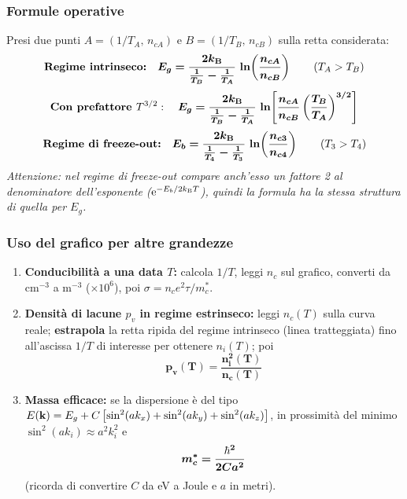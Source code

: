 \subsubsection*{Formule operative}
Presi due punti $A=(1/T_A,\,n_{cA})$ e $B=(1/T_B,\,n_{cB})$ sulla retta considerata:
\[ \textbf{Regime intrinseco:}\quad \bm{E_g = \frac{2k_{\mathrm{B}}}{\frac{1}{T_B}-\frac{1}{T_A}}\,\ln\!\left(\frac{n_{cA}}{n_{cB}}\right)}
   \qquad (T_A>T_B) \]
\[ \textbf{Con prefattore } T^{3/2}:\quad \bm{E_g = \frac{2k_{\mathrm{B}}}{\frac{1}{T_B}-\frac{1}{T_A}}\,\ln\!\left[\frac{n_{cA}}{n_{cB}}\left(\frac{T_B}{T_A}\right)^{3/2}\right]} \]
\[ \textbf{Regime di freeze-out:}\quad \bm{E_b = \frac{2k_{\mathrm{B}}}{\frac{1}{T_4}-\frac{1}{T_3}}\,\ln\!\left(\frac{n_{c3}}{n_{c4}}\right)}
   \qquad (T_3>T_4) \]
\textit{Attenzione: nel regime di freeze-out compare anch'esso un fattore 2 al denominatore dell'esponente ($\mathrm{e}^{-E_b/2k_{\mathrm{B}} T}$), quindi la formula ha la stessa struttura di quella per $E_g$.}

\subsubsection*{Uso del grafico per altre grandezze}
\begin{enumerate}
    \item \textbf{Conducibilità a una data $T$:} calcola $1/T$, leggi $n_c$ sul grafico, converti da cm$^{-3}$ a m$^{-3}$ ($\times10^6$), poi $\sigma = n_ce^2\tau/m_c^*$.
    \item \textbf{Densità di lacune $p_v$ in regime estrinseco:} leggi $n_c(T)$ sulla curva reale; \textbf{estrapola} la retta ripida del regime intrinseco (linea tratteggiata) fino all'ascissa $1/T$ di interesse per ottenere $n_i(T)$; poi
    \[ \bm{p_v(T) = \frac{n_i^2(T)}{n_c(T)}} \]
    \item \textbf{Massa efficace:} se la dispersione è del tipo $E(\mathbf{k})=E_g+C\left[\sin^2(ak_x)+\sin^2(ak_y)+\sin^2(ak_z)\right]$, in prossimità del minimo $\sin^2(ak_i)\approx a^2k_i^2$ e
    \[ \bm{m_c^* = \frac{\hbar^2}{2Ca^2}} \]
    (ricorda di convertire $C$ da eV a Joule e $a$ in metri).
\end{enumerate}


